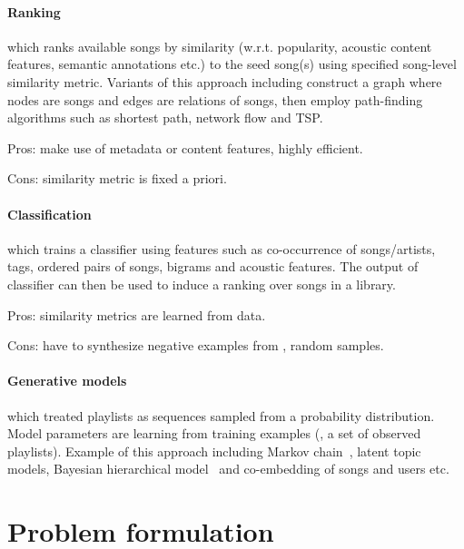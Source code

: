 \paragraph{Ranking} which ranks available songs by similarity (w.r.t. popularity, acoustic content features, semantic annotations etc.) 
to the seed song(s) using specified song-level similarity metric.
Variants of this approach including construct a graph where nodes are songs and edges are relations of songs,
then employ path-finding algorithms such as shortest path, network flow and TSP.
\begin{description}
\item Pros: make use of metadata or content features, highly efficient.
\item Cons: similarity metric is fixed a priori.
\end{description}


\paragraph{Classification} which trains a classifier using features such as co-occurrence of songs/artists, tags, 
ordered pairs of songs, bigrams and acoustic features. The output of classifier can then be used to induce a ranking over songs in a library.
\begin{description}
\item Pros: similarity metrics are learned from data.
\item Cons: have to synthesize negative examples from \eg, random samples.
\end{description}


\paragraph{Generative models} which treated playlists as sequences sampled from a probability distribution. 
Model parameters are learning from training examples (\ie, a set of observed playlists).
Example of this approach including Markov chain~\cite{chen2012playlist}, latent topic models, Bayesian hierarchical model~\cite{bengroove2017} 
and co-embedding of songs and users etc.


\section{Problem formulation}
\label{sec:formulation}

